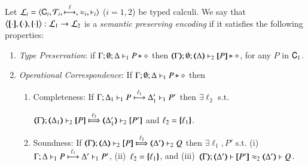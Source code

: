 \begin{definition}\rm
\label{def:ep}
       Let  $\tyl{L}_i=\calc{\CAL_i}{{\cal{T}}_i}{\hby{\ell}}{\wb_i}{\proves_i}$
       ($i=1,2$) be typed calculi. 
We say that $\enco{\map{\cdot}, \mapt{\cdot}, \mapa{\cdot}}: \tyl{L}_1 \to \tyl{L}_2$ is a \emph{semantic preserving encoding}
if it satisfies the following properties:
	
	\begin{enumerate}[1.]
		\item \emph{Type Preservation}:
	if
	$\Gamma; \emptyset; \Delta \proves_1 P \hastype \Proc$ then 
	$\mapt{\Gamma}; \emptyset; \mapt{\Delta} \proves_2 \map{P} \hastype \Proc$,  
	for any   $P$ in $\CAL_1$.

	\item \emph{Operational Correspondence}: If $\Gamma; \emptyset; \Delta \proves_1 P \hastype \Proc$ then
		\begin{enumerate}[-]
			\item	Completeness: 
			   If  
$\stytraarg{\Gamma}{\ell_1}{\Delta_1}{P}{\Delta'_1}{P'}{1}$
			   then $\exists \ell_2$ s.t. 

$\wtytraarg{\mapt{\Gamma}}{\ell_2}{\mapt{\Delta_1}}{\map{P}}{\mapt{\Delta'_1}}{\map{P'}}{2}$
			    and $\ell_2 = \mapa{\ell_1}$.
			    				
				
			\item	Soundness:   
				If  $\wtytraarg{\mapt{\Gamma}}{\ell_2}{\mapt{\Delta}}{\map{P}}{\mapt{\Delta'}}{Q}{2}$
				then $\exists \ell_1, P'$ s.t.  
				(i)~$\stytraarg{\Gamma}{\ell_1}{\Delta}{P}{\Delta'}{P'}{1}$,
				(ii)~$\ell_2 = \mapa{\ell_1}$, and
				(iii)~$\horel{\mapt{\Gamma}}{\mapt{\Delta'}}{\map{P'}}{\wb_2}{\mapt{\Delta'}}{Q}$.

		\end{enumerate}
		

\end{enumerate}
\end{definition}
